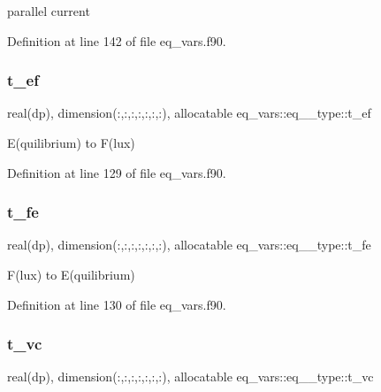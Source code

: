 parallel current 



Definition at line 142 of file eq\+\_\+vars.\+f90.

\mbox{\label{structeq__vars_1_1eq__2__type_aa8975d6f7d0a542e46cff08202007bfb}} 
\subsubsection{\texorpdfstring{t\+\_\+ef}{t\_ef}}
{\footnotesize\ttfamily real(dp), dimension(\+:,\+:,\+:,\+:,\+:,\+:,\+:), allocatable eq\+\_\+vars\+::eq\+\_\+\_\+type\+::t\+\_\+ef}



E(quilibrium) to F(lux) 



Definition at line 129 of file eq\+\_\+vars.\+f90.

\mbox{\label{structeq__vars_1_1eq__2__type_ad2f94e2ccb8336a3fbf825febfb5a1d4}} 
\subsubsection{\texorpdfstring{t\+\_\+fe}{t\_fe}}
{\footnotesize\ttfamily real(dp), dimension(\+:,\+:,\+:,\+:,\+:,\+:,\+:), allocatable eq\+\_\+vars\+::eq\+\_\+\_\+type\+::t\+\_\+fe}



F(lux) to E(quilibrium) 



Definition at line 130 of file eq\+\_\+vars.\+f90.

\mbox{\label{structeq__vars_1_1eq__2__type_a66f2d562690cd4176fff5ad75d5feafb}} 
\subsubsection{\texorpdfstring{t\+\_\+vc}{t\_vc}}
{\footnotesize\ttfamily real(dp), dimension(\+:,\+:,\+:,\+:,\+:,\+:,\+:), allocatable eq\+\_\+vars\+::eq\+\_\+\_\+type\+::t\+\_\+vc}



